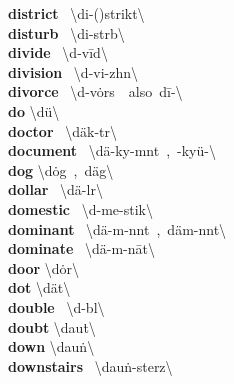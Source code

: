 \documentclass[10pt,a4paper]{article}
\begin{document}
\begin{multicols}{2}
\textbf{ district }\quad \ \textbackslash \textprimstress di-(\textsecstress )strikt\textbackslash \\
\textbf{ disturb }\quad \ \textbackslash di-\textprimstress st\textschwa rb\textbackslash \\
\textbf{ divide }\quad \ \textbackslash d\textschwa -\textprimstress v\={i}d\textbackslash \\
\textbf{ division }\quad \ \textbackslash d\textschwa -\textprimstress vi-zh\textschwa n\textbackslash \\
\textbf{ divorce }\quad \ \textbackslash d\textschwa -\textprimstress v\.{o}rs\ \ also\ d\={i}-\textbackslash \\
\textbf{ do }\quad \textbackslash \textprimstress d\"{u}\textbackslash \\
\textbf{ doctor }\quad \ \textbackslash \textprimstress d\"{a}k-t\textschwa r\textbackslash \\
\textbf{ document }\quad \ \textbackslash \textprimstress d\"{a}-ky\textschwa -m\textschwa nt\ ,\ -ky\"{u}-\textbackslash \\
\textbf{ dog }\quad \textbackslash \textprimstress d\.{o}g\ ,\ \textprimstress d\"{a}g\textbackslash \\
\textbf{ dollar }\quad \ \textbackslash \textprimstress d\"{a}-l\textschwa r\textbackslash \\
\textbf{ domestic }\quad \ \textbackslash d\textschwa -\textprimstress me-stik\textbackslash \\
\textbf{ dominant }\quad \ \textbackslash \textprimstress d\"{a}-m\textschwa -n\textschwa nt\ ,\ \textprimstress d\"{a}m-n\textschwa nt\textbackslash \\
\textbf{ dominate }\quad \ \textbackslash \textprimstress d\"{a}-m\textschwa -\textsecstress n\={a}t\textbackslash \\
\textbf{ door }\quad \textbackslash \textprimstress d\.{o}r\textbackslash \\
\textbf{ dot }\quad \textbackslash \textprimstress d\"{a}t\textbackslash \\
\textbf{ double }\quad \ \textbackslash \textprimstress d\textschwa -b\textschwa l\textbackslash \\
\textbf{ doubt }\quad \textbackslash \textprimstress dau\. t\textbackslash \\
\textbf{ down }\quad \textbackslash \textprimstress dau\. n\textbackslash \\
\textbf{ downstairs }\quad \ \textbackslash \textprimstress dau\. n-\textprimstress sterz\textbackslash \\

\end{multicols}
\end{document}
